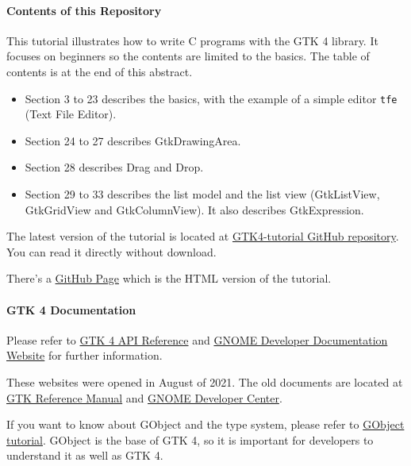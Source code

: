 \paragraph{Contents of this
Repository}\label{contents-of-this-repository}

This tutorial illustrates how to write C programs with the GTK 4
library. It focuses on beginners so the contents are limited to the
basics. The table of contents is at the end of this abstract.

\begin{itemize}
\tightlist
\item
  Section 3 to 23 describes the basics, with the example of a simple
  editor \passthrough{\lstinline!tfe!} (Text File Editor).
\item
  Section 24 to 27 describes GtkDrawingArea.
\item
  Section 28 describes Drag and Drop.
\item
  Section 29 to 33 describes the list model and the list view
  (GtkListView, GtkGridView and GtkColumnView). It also describes
  GtkExpression.
\end{itemize}

The latest version of the tutorial is located at
\href{https://github.com/ToshioCP/Gtk4-tutorial}{GTK4-tutorial GitHub
repository}. You can read it directly without download.

There's a \href{https://toshiocp.github.io/Gtk4-tutorial/}{GitHub Page}
which is the HTML version of the tutorial.

\paragraph{GTK 4 Documentation}\label{gtk-4-documentation}

Please refer to \href{https://docs.gtk.org/gtk4/index.html}{GTK 4 API
Reference} and \href{https://developer.gnome.org/}{GNOME Developer
Documentation Website} for further information.

These websites were opened in August of 2021. The old documents are
located at \href{https://developer-old.gnome.org/gtk4/stable/}{GTK
Reference Manual} and \href{https://developer-old.gnome.org/}{GNOME
Developer Center}.

If you want to know about GObject and the type system, please refer to
\href{https://github.com/ToshioCP/Gobject-tutorial}{GObject tutorial}.
GObject is the base of GTK 4, so it is important for developers to
understand it as well as GTK 4.


